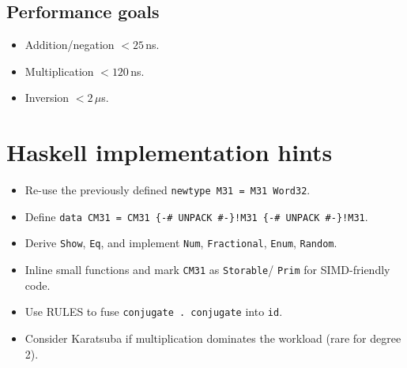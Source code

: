 \documentclass{article}
\begin{document}
\subsection{Performance goals}

\begin{itemize}[nosep]
\item Addition/negation \(<\!25\)\,ns.
\item Multiplication \(<\!120\)\,ns.
\item Inversion \(<\!2\)\,$\mu$s.
\end{itemize}

\section{Haskell implementation hints}

\begin{itemize}[nosep]
\item Re-use the previously defined
      \verb|newtype M31 = M31 Word32|.
\item Define
      \verb|data CM31 = CM31 {-# UNPACK #-}!M31 {-# UNPACK #-}!M31|.
\item Derive \verb|Show|, \verb|Eq|, and implement
      \verb|Num|, \verb|Fractional|, \verb|Enum|, \verb|Random|.
\item Inline small functions and mark
      \verb|CM31| as \verb|Storable|/ \verb|Prim| for SIMD-friendly code.
\item Use RULES to fuse \verb|conjugate . conjugate| into \verb|id|.
\item Consider Karatsuba if multiplication
      dominates the workload (rare for degree 2).
\end{itemize}
\end{document}
